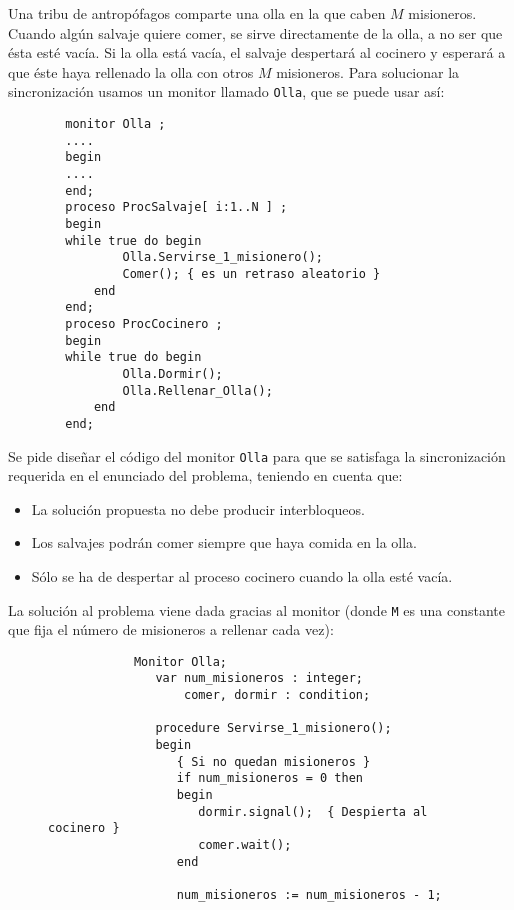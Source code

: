 \begin{ejercicio}
    Una tribu de antropófagos comparte una olla en la que caben $M$ misioneros. Cuando algún salvaje quiere comer, se sirve directamente de la olla, a no ser que ésta esté vacía. Si la olla está vacía, el salvaje despertará al cocinero y esperará a que éste haya rellenado la olla con otros $M$ misioneros. Para solucionar la sincronización usamos un monitor llamado \verb|Olla|, que se puede usar así:
    \begin{verbatim}
        monitor Olla ;
        ....
        begin
        ....
        end;
        proceso ProcSalvaje[ i:1..N ] ;
        begin
        while true do begin
                Olla.Servirse_1_misionero();
                Comer(); { es un retraso aleatorio }
            end
        end;
        proceso ProcCocinero ;
        begin
        while true do begin
                Olla.Dormir();
                Olla.Rellenar_Olla();
            end
        end;
    \end{verbatim}

    Se pide diseñar el código del monitor \verb|Olla| para que se satisfaga la sincronización requerida en el enunciado del problema, teniendo en cuenta que:
    \begin{itemize}
        \item La solución propuesta no debe producir interbloqueos.
        \item Los salvajes podrán comer siempre que haya comida en la olla.
        \item Sólo se ha de despertar al proceso cocinero cuando la olla esté vacía.
    \end{itemize}

    La solución al problema viene dada gracias al monitor (donde \verb|M| es una constante que fija el número de misioneros a rellenar cada vez):
    \begin{figure}[H]
        \centering
        \begin{verbatim}
            Monitor Olla;
               var num_misioneros : integer;
                   comer, dormir : condition;

               procedure Servirse_1_misionero();
               begin
                  { Si no quedan misioneros }
                  if num_misioneros = 0 then
                  begin
                     dormir.signal();  { Despierta al cocinero }
                     comer.wait();
                  end

                  num_misioneros := num_misioneros - 1;


\end{verbatim}
\end{figure}
\end{ejercicio}
